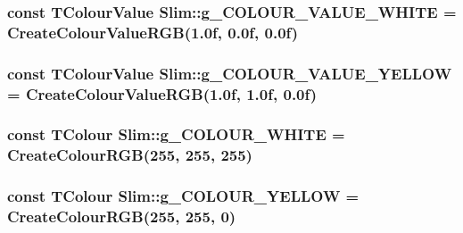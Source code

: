 \subsubsection[{g\+\_\+\+C\+O\+L\+O\+U\+R\+\_\+\+V\+A\+L\+U\+E\+\_\+\+W\+H\+I\+T\+E}]{\setlength{\rightskip}{0pt plus 5cm}const {\bf T\+Colour\+Value} Slim\+::g\+\_\+\+C\+O\+L\+O\+U\+R\+\_\+\+V\+A\+L\+U\+E\+\_\+\+W\+H\+I\+T\+E = {\bf Create\+Colour\+Value\+R\+G\+B}(1.\+0f, 0.\+0f, 0.\+0f)}\label{namespace_slim_a9c8494b2d8142c2a5348b46f2f84f221}
\hypertarget{namespace_slim_a8e2fd0c514f1ec5a9986b1573e3c9a74}{}
\subsubsection[{g\+\_\+\+C\+O\+L\+O\+U\+R\+\_\+\+V\+A\+L\+U\+E\+\_\+\+Y\+E\+L\+L\+O\+W}]{\setlength{\rightskip}{0pt plus 5cm}const {\bf T\+Colour\+Value} Slim\+::g\+\_\+\+C\+O\+L\+O\+U\+R\+\_\+\+V\+A\+L\+U\+E\+\_\+\+Y\+E\+L\+L\+O\+W = {\bf Create\+Colour\+Value\+R\+G\+B}(1.\+0f, 1.\+0f, 0.\+0f)}\label{namespace_slim_a8e2fd0c514f1ec5a9986b1573e3c9a74}
\hypertarget{namespace_slim_aabd7d1ab5686441d89da465b5d78e06c}{}
\subsubsection[{g\+\_\+\+C\+O\+L\+O\+U\+R\+\_\+\+W\+H\+I\+T\+E}]{\setlength{\rightskip}{0pt plus 5cm}const {\bf T\+Colour} Slim\+::g\+\_\+\+C\+O\+L\+O\+U\+R\+\_\+\+W\+H\+I\+T\+E = {\bf Create\+Colour\+R\+G\+B}(255, 255, 255)}\label{namespace_slim_aabd7d1ab5686441d89da465b5d78e06c}
\hypertarget{namespace_slim_aff93ca871b54f6167a23aaaedf4eba95}{}
\subsubsection[{g\+\_\+\+C\+O\+L\+O\+U\+R\+\_\+\+Y\+E\+L\+L\+O\+W}]{\setlength{\rightskip}{0pt plus 5cm}const {\bf T\+Colour} Slim\+::g\+\_\+\+C\+O\+L\+O\+U\+R\+\_\+\+Y\+E\+L\+L\+O\+W = {\bf Create\+Colour\+R\+G\+B}(255, 255, 0)}\label{namespace_slim_aff93ca871b54f6167a23aaaedf4eba95}
